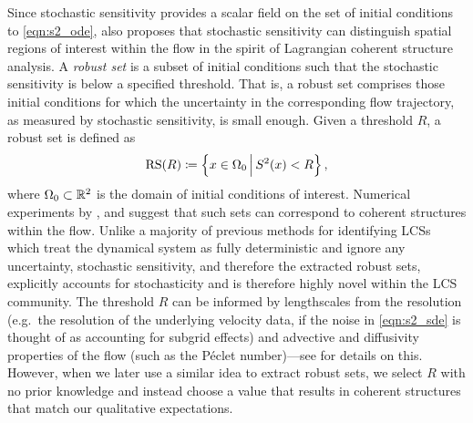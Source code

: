 Since stochastic sensitivity provides a scalar field on the set of initial conditions to \cref{eqn:s2_ode}, \citet{Balasuriya_2020_StochasticSensitivityComputable} also proposes that stochastic sensitivity can distinguish spatial regions of interest within the flow in the spirit of Lagrangian coherent structure analysis.
A \emph{robust set} is a subset of initial conditions such that the stochastic sensitivity is below a specified threshold.
That is, a robust set comprises those initial conditions for which the uncertainty in the corresponding flow trajectory, as measured by stochastic sensitivity, is small enough.
Given a threshold \(R\), a robust set is defined as
\[
	\mathrm{RS}\!\left(R\right) \coloneqq \left\{x \in \Omega_0\,\middle|\,S^2\!\left(x\right) < R\right\},
\]
where \(\Omega_0 \subset \mathbb{R}^2\) is the domain of initial conditions of interest.
Numerical experiments by \citet{Balasuriya_2020_StochasticSensitivityComputable}, and \citet{BadzaEtAl_2023_HowSensitiveAre} suggest that such sets can correspond to coherent structures within the flow.
Unlike a majority of previous methods for identifying LCSs which treat the dynamical system as fully deterministic and ignore any uncertainty, stochastic sensitivity, and therefore the extracted robust sets, explicitly accounts for stochasticity and is therefore highly novel within the LCS community.
The threshold \(R\) can be informed by lengthscales from the resolution (e.g.\ the resolution of the underlying velocity data, if the noise in \cref{eqn:s2_sde} is thought of as accounting for subgrid effects) and advective and diffusivity properties of the flow (such as the P\'eclet number)---see \citet{Balasuriya_2020_StochasticSensitivityComputable} for details on this.
However, when we later use a similar idea to extract robust sets, we select \(R\) with no prior knowledge and instead choose a value that results in coherent structures that match our qualitative expectations.


